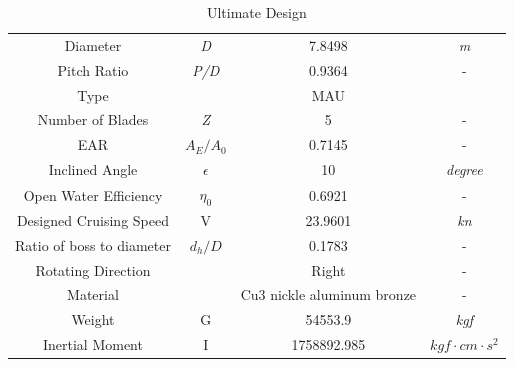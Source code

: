 \documentclass[a4paper,UTF8]{article}
\begin{document}
\begin{table}[htbp]
	\centering
	\begin{tabular}{cccc}
		\hline
		Diameter & \textit{D} & 7.8498   & \textit{m}\\
		Pitch Ratio & \textit{P/D} & 0.9364  & - \\
		Type  &  & MAU &  \\
		Number of Blades & \textit{Z} & 5     &- \\
		EAR   & $A_E/A_0$ & 0.7145 & - \\
		Inclined Angle & $\epsilon$ & 10    & \textit{degree} \\
		Open Water Efficiency & $\eta_0 $ & 0.6921 & - \\
		Designed Cruising Speed & V     & 23.9601  & \textit{kn} \\
		Ratio of boss to diameter & $d_h/D$  & 0.1783 & - \\
		Rotating Direction &  & Right & - \\
		Material & & Cu3 nickle  aluminum bronze & - \\
		Weight & G     & 54553.9 & \textit{kgf} \\
		Inertial Moment & I & 1758892.985 & $kgf·cm·s^2$\\
		\hline
	\end{tabular}%
	\caption{Ultimate Design}
	\label{tab:conclusion}%
\end{table}%
\end{document}
